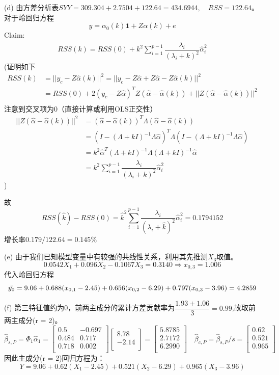 \documentclass[cn,hazy,green,12pt,normal]{elegantnote}
\numberwithin{equation}{section}
\numberwithin{subsection}{section}
\begin{document}
\noindent (d) 由方差分析表$SYY = 309.304+2.7504+122.64 = 434.6944, \quad RSS = 122.64$。
对于岭回归方程
\[y = \alpha_0(k)\bm 1 + Z\alpha(k) + e\]
Claim:
\begin{align*}
    RSS(k) = RSS(0) +  k^2\sum_{i = 1}^{p-1}\dfrac{\lambda_i}{(\lambda_i + k)^2}\hat{\alpha}_i^2
\end{align*}
(证明如下
\begin{align*}
    RSS(k) &= ||y_c - Z\hat{\alpha}(k)||^2 = ||y_c - Z\hat{\alpha} + Z\hat{\alpha}-Z\hat{\alpha}(k)||^2 \\
    & = RSS(0) + 2(y_c - Z\hat{\alpha})^TZ(\hat{\alpha}-\hat{\alpha}(k))+ ||Z(\hat{\alpha}-\hat{\alpha}(k))||^2\\
\end{align*}
注意到交叉项为0（直接计算或利用OLS正交性）
\begin{align*}
    ||Z(\hat{\alpha}-\hat{\alpha}(k))||^2 &= (\hat{\alpha}-\hat{\alpha}(k))^T\Lambda (\hat{\alpha}-\hat{\alpha}(k)) \\
    &= (I - (\Lambda +kI)^{-1}\Lambda\hat{\alpha})^T\Lambda (I - (\Lambda +kI)^{-1}\Lambda\hat{\alpha})\\
    & = k^2 \hat{\alpha}^T(\Lambda + kI)^{-1}\Lambda (\Lambda + kI)^{-1} \hat{\alpha} \\
    & =  k^2\sum_{i = 1}^{p-1}\dfrac{\lambda_i}{(\lambda_i + k)^2}\hat{\alpha}_i^2
\end{align*})

故\[
RSS(\hat{k})- RSS(0) = \hat{k}^2\sum_{i = 1}^{p-1}\dfrac{\lambda_i}{(\lambda_i + \hat{k})^2}\hat{\alpha}_i^2 = 0.1794152\]
增长率$0.179/122.64 = 0.145\%$

\noindent (e) 由于我们已知模型变量中有较强的共线性关系，利用其先推测$X_3$取值。
\[0.0542X_1 + 0.096X_2 -0.1067X_3 = 0.3140 \Rightarrow x_{0,3} = 1.006 \]
代入岭回归方程
\[\Tilde{y_0} = 9.06 + 0.688(x_{0,1} - 2.45) + 0.656(x_{0,2} - 6.29) + 0.797(x_{0,3} - 3.96) = 4.2859\]

\noindent (f) 第三特征值约为0，前两主成分的累计方差贡献率为$\dfrac{1.93+1.06}{3} = 0.99$,故取前两主成分(r = 2)。
\[\hat{\beta}_{s,P} = \Phi_1 \hat{\alpha}_1 = \begin{bmatrix}
    0.5 & -0.697\\
    0.484 & 0.717 \\
    0.718 & 0.002\\
\end{bmatrix}\begin{bmatrix}
    8.78\\
    -2.14\\
\end{bmatrix} = \begin{bmatrix}
    5.8785\\
    2.7172\\
    6.2990\\
\end{bmatrix}\quad \hat{\beta}_{c,P} = \hat{\beta}_{s, P}/ s = \begin{bmatrix}
    0.62\\
    0.521\\
    0.965\\
\end{bmatrix}
\]
因此主成分(r = 2)回归方程为：
\[Y = 9.06 + 0.62(X_1 - 2.45) + 0.521(X_2 - 6.29) + 0.965(X_3 - 3.96)\]
\end{document}
